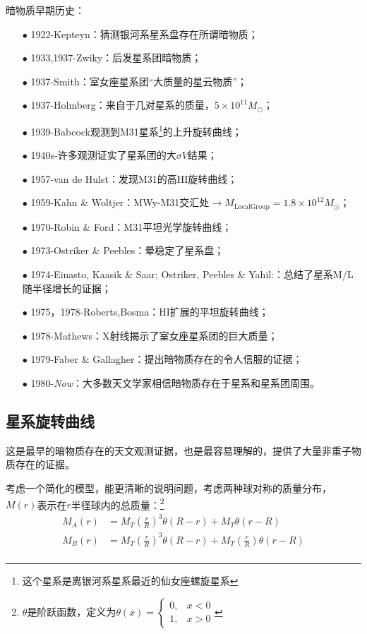 \documentclass{ctexart}
\begin{document}
	暗物质早期历史：
	\begin{enumerate}
		\item[$\bullet$] 1922-Kepteyn：猜测银河系星系盘存在所谓暗物质；
		\item[$\bullet$] 1933,1937-Zwiky：后发星系团暗物质；
		\item[$\bullet$] 1937-Smith：室女座星系团“大质量的星云物质”；
		\item[$\bullet$] 1937-Holmberg：来自于几对星系的质量，$5\times 10^{11}M_{\odot}$；
		\item[$\bullet$] 1939-Babcock观测到M31星系\footnote{这个星系是离银河系星系最近的仙女座螺旋星系}的上升旋转曲线；
		\item[$\bullet$] 1940s-许多观测证实了星系团的大$\sigma V$结果；
		\item[$\bullet$] 1957-van de Hulst：发现M31的高HI旋转曲线；
		\item[$\bullet$] 1959-Kahn \& Woltjer：MWy-M31交汇处$\to M_{\text{LocalGroup}}=1.8\times 10^{12} M_\odot$；
		\item[$\bullet$] 1970-Robin \& Ford：M31平坦光学旋转曲线；
		\item[$\bullet$] 1973-Ostriker \& Peebles：晕稳定了星系盘；
		\item[$\bullet$] 1974-Einasto, Kaasik \& Saar; Ostriker, Peebles \& Yahil:：总结了星系M/L随半径增长的证据；
		\item[$\bullet$] 1975，1978-Roberts,Bosma：HI扩展的平坦旋转曲线；
		\item[$\bullet$] 1978-Mathews：X射线揭示了室女座星系团的巨大质量；
		\item[$\bullet$] 1979-Faber \& Gallagher：提出暗物质存在的令人信服的证据；
		\item[$\bullet$] 1980-\textit{Now}：大多数天文学家相信暗物质存在于星系和星系团周围。
	\end{enumerate}
	\subsection{星系旋转曲线}
	这是最早的暗物质存在的天文观测证据，也是最容易理解的，提供了大量非重子物质存在的证据。
	
	考虑一个简化的模型，能更清晰的说明问题，考虑两种球对称的质量分布，$M(r)$表示在$r$半径球内的总质量：\footnote{$\theta$是阶跃函数，定义为$\theta(x)=\begin{cases}
			0,& x<0\\
			1,& x>0
		\end{cases}$}
	\begin{align}
		\label{caseA} M_A(r)&=M_T\left(\frac{r}{R}\right)^3\theta(R-r)+M_T\theta(r-R)\\
		\label{caseB} M_B(r)&=M_T\left(\frac{r}{R}\right)^3\theta(R-r)+M_T\left(\frac{r}{R}\right)\theta(r-R)\\
	\end{align}
\end{document}
